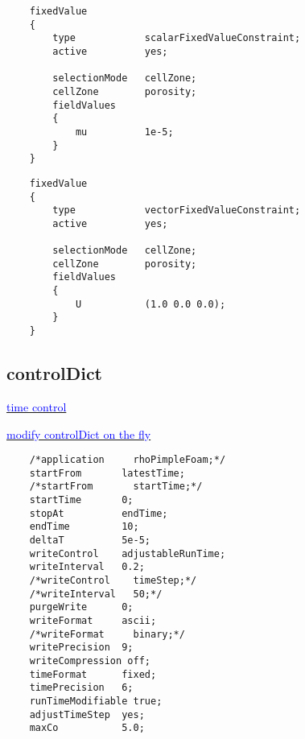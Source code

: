 \documentclass[a4paper, 12pt]{article}
\numberwithin{equation}{section}
\newcommand{\blue}[1]{\textcolor{blue}{#1}}
\begin{document}
    \begin{minipage}{\textwidth}
    \vspace{12pt}
    {
    \begin{verbatim}
    fixedValue
    {
        type            scalarFixedValueConstraint;
        active          yes;

        selectionMode   cellZone;
        cellZone        porosity;
        fieldValues
        {
            mu          1e-5;
        }
    }
    \end{verbatim}
    }
    \end{minipage}

    \begin{minipage}{\textwidth}
    \vspace{12pt}
    {
    \begin{verbatim}
    fixedValue
    {
        type            vectorFixedValueConstraint;
        active          yes;

        selectionMode   cellZone;
        cellZone        porosity;
        fieldValues
        {
            U           (1.0 0.0 0.0);
        }
    }
    \end{verbatim}
    }
    \end{minipage}

    \subsection{controlDict}

    \href{https://www.openfoam.com/documentation/user-guide/6-solving/6.1-time-and-data-inputoutput-control}{\blue{time control}}

    \href{https://www.cfd-online.com/Forums/openfoam-solving/128713-varying-time-step.html}{\blue{modify controlDict on the fly}}

    {
    \begin{verbatim}
    /*application     rhoPimpleFoam;*/
    startFrom       latestTime;
    /*startFrom       startTime;*/
    startTime       0;
    stopAt          endTime;
    endTime         10;
    deltaT          5e-5;
    writeControl    adjustableRunTime;
    writeInterval   0.2;
    /*writeControl    timeStep;*/
    /*writeInterval   50;*/
    purgeWrite      0;
    writeFormat     ascii;
    /*writeFormat     binary;*/
    writePrecision  9;
    writeCompression off;
    timeFormat      fixed;
    timePrecision   6;
    runTimeModifiable true;
    adjustTimeStep  yes;
    maxCo           5.0;
    \end{verbatim}
    }
\end{document}
